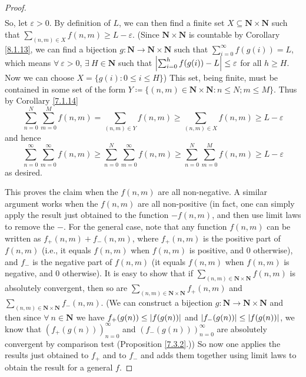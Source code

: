 \begin{proof}
\begin{align*}
    \end{align*}
    So, let \(\varepsilon > 0\).
    By definition of \(L\), we can then find a finite set \(X \subseteq \mathbf{N} \times \mathbf{N}\) such that \(\sum_{(n, m) \in X} f(n, m) \geq L - \varepsilon\).
    (Since \(\mathbf{N} \times \mathbf{N}\) is countable by Corollary \ref{8.1.13}, we can find a bijection \(g : \mathbf{N} \to \mathbf{N} \times \mathbf{N}\) such that \(\sum_{i = 0}^\infty f(g(i)) = L\), which means \(\forall\ \varepsilon > 0\), \(\exists\ H \in \mathbf{N}\) such that \(\abs*{\sum_{i = 0}^h f(g(i)) - L} \leq \varepsilon\) for all \(h \geq H\).
    Now we can choose \(X = \{g(i) : 0 \leq i \leq H\}\))
    This set, being finite, must be contained in some set of the form \(Y \coloneqq \{(n,m) \in \mathbf{N} \times \mathbf{N} : n \leq N; m \leq M \}\).
    Thus by Corollary \ref{7.1.14}
    \[
        \sum_{n = 0}^N \sum_{m = 0}^M f(n, m) = \sum_{(n, m) \in Y} f(n, m) \geq \sum_{(n, m) \in X} f(n, m) \geq L - \varepsilon
    \]
    and hence
    \[
        \sum_{n = 0}^\infty \sum_{m = 0}^\infty f(n, m) \geq \sum_{n = 0}^N \sum_{m = 0}^\infty f(n, m) \geq \sum_{n = 0}^N \sum_{m = 0}^M f(n, m) \geq L - \varepsilon
    \]
    as desired.

    This proves the claim when the \(f(n, m)\) are all non-negative.
    A similar argument works when the \(f(n, m)\) are all non-positive
    (in fact, one can simply apply the result just obtained to the function \(-f(n, m)\), and then use limit laws to remove the \(-\).
    For the general case, note that any function \(f(n, m)\) can be written as \(f_+(n, m) + f_-(n, m)\), where \(f_+(n, m)\) is the positive part of \(f(n, m)\)
    (i.e., it equals \(f(n, m)\) when \(f(n, m)\) is positive, and \(0\) otherwise),
    and \(f_-\) is the negative part of \(f(n, m)\)
    (it equals \(f(n, m)\) when \(f(n, m)\) is negative, and \(0\) otherwise).
    It is easy to show that if \(\sum_{(n, m) \in \mathbf{N} \times \mathbf{N}} f(n, m)\) is absolutely convergent, then so are \(\sum_{(n, m) \in \mathbf{N} \times \mathbf{N}} f_+(n, m)\) and \(\sum_{(n, m) \in \mathbf{N} \times \mathbf{N}} f_-(n, m)\).
    (We can construct a bijection \(g : \mathbf{N} \to \mathbf{N} \times \mathbf{N}\) and then since \(\forall\ n \in \mathbf{N}\) we have \(f_+(g(n)) \leq \abs*{f(g(n))}\) and \(\abs*{f_-(g(n))} \leq \abs*{f(g(n))}\), we know that \((f_+(g(n)))_{n = 0}^\infty\) and \((f_-(g(n)))_{n = 0}^\infty\) are absolutely convergent by comparison test (Proposition \ref{7.3.2}.))
    So now one applies the results just obtained to \(f_+\) and to \(f_-\) and adds them together using limit laws to obtain the result for a general \(f\).
\end{proof}

